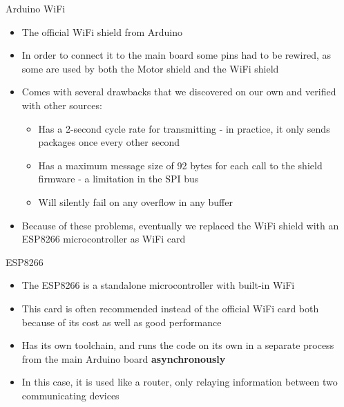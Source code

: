 \documentclass[12pt]{beamer}
\begin{document}
\begin{frame}{Arduino WiFi}
  \begin{itemize}
  \item<+-> The official WiFi shield from Arduino \cite{wifishield}
  \item<+-> In order to connect it to the main board some pins had to be rewired, as some are used by both the Motor shield and the WiFi shield
  \item<+-> Comes with several drawbacks that we discovered on our own and verified with other sources:
    \begin{itemize}
    \item<+-> Has a 2-second cycle rate for transmitting - in practice, it only sends packages once every other second
    \item<+-> Has a maximum message size of 92 bytes for each call to the shield firmware - a limitation in the SPI bus
    \item<+-> Will silently fail on any overflow in any buffer \cite{wificard1, wificard2}
    \end{itemize}
    \item<+-> Because of these problems, eventually we replaced the WiFi shield with an ESP8266 microcontroller as WiFi card
  \end{itemize}
\end{frame}
\begin{frame}{ESP8266}
  \begin{itemize}
    \item<+-> The ESP8266 is a standalone microcontroller with built-in WiFi \cite{ESP8266}
    \item<+-> This card is often recommended instead of the official WiFi card both because of its cost as well as good performance
    \item<+-> Has its own toolchain, and runs the code on its own in a separate process from the main Arduino board \textbf{asynchronously}
    \item<+-> In this case, it is used like a router, only relaying information between two communicating devices
  \end{itemize}
\end{frame}
\end{document}
